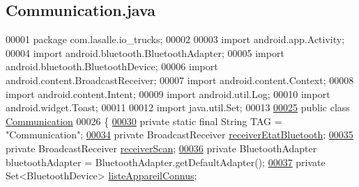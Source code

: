\hypertarget{_communication_8java_source}{}\subsection{Communication.\+java}
\label{_communication_8java_source}

\begin{DoxyCode}
00001 \textcolor{keyword}{package }com.lasalle.io\_trucks;
00002 
00003 \textcolor{keyword}{import} android.app.Activity;
00004 \textcolor{keyword}{import} android.bluetooth.BluetoothAdapter;
00005 \textcolor{keyword}{import} android.bluetooth.BluetoothDevice;
00006 \textcolor{keyword}{import} android.content.BroadcastReceiver;
00007 \textcolor{keyword}{import} android.content.Context;
00008 \textcolor{keyword}{import} android.content.Intent;
00009 \textcolor{keyword}{import} android.util.Log;
00010 \textcolor{keyword}{import} android.widget.Toast;
00011 
00012 \textcolor{keyword}{import} java.util.Set;
00013 
\hyperlink{classcom_1_1lasalle_1_1io__trucks_1_1_communication}{00025} \textcolor{keyword}{public} \textcolor{keyword}{class }\hyperlink{classcom_1_1lasalle_1_1io__trucks_1_1_communication}{Communication}
00026 \{
\hyperlink{classcom_1_1lasalle_1_1io__trucks_1_1_communication_aec1062036f071d51a4925a3080d71004}{00030}     \textcolor{keyword}{private} \textcolor{keyword}{static} \textcolor{keyword}{final} String TAG = \textcolor{stringliteral}{"Communication"};
\hyperlink{classcom_1_1lasalle_1_1io__trucks_1_1_communication_a4a45e2d6f9b84afa60b4a28b52f5a4bf}{00034}     \textcolor{keyword}{private} BroadcastReceiver \hyperlink{classcom_1_1lasalle_1_1io__trucks_1_1_communication_a4a45e2d6f9b84afa60b4a28b52f5a4bf}{receiverEtatBluetooth};
\hyperlink{classcom_1_1lasalle_1_1io__trucks_1_1_communication_aa226d389c696b51929ee0b62cfd04710}{00035}     \textcolor{keyword}{private} BroadcastReceiver \hyperlink{classcom_1_1lasalle_1_1io__trucks_1_1_communication_aa226d389c696b51929ee0b62cfd04710}{receiverScan};
\hyperlink{classcom_1_1lasalle_1_1io__trucks_1_1_communication_aab37c21038f7b794ab77e6705b8b5938}{00036}     \textcolor{keyword}{private} BluetoothAdapter bluetoothAdapter = BluetoothAdapter.getDefaultAdapter();
\hyperlink{classcom_1_1lasalle_1_1io__trucks_1_1_communication_af0441da9cbe4ea858b82214ece930197}{00037}     \textcolor{keyword}{private} Set<BluetoothDevice> \hyperlink{classcom_1_1lasalle_1_1io__trucks_1_1_communication_af0441da9cbe4ea858b82214ece930197}{listeAppareilConnus};

\end{DoxyCode}

